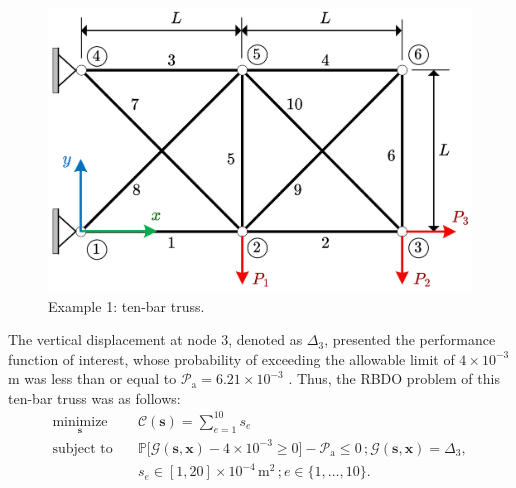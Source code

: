 \documentclass[preprint,3p]{elsarticle}
\begin{document}
\begin{linenumbers}
\begin{figure}[ht]
    \begin{center}
        \includegraphics[scale=0.6]{Fig5.jpg}
    \end{center}
    \caption{Example 1: ten-bar truss.}
    \label{FIG:5}
\end{figure}

The vertical displacement at node 3, denoted as $\Delta_3$,
presented the performance function of interest, whose probability
of exceeding the allowable limit of $4\times10^{-3}$ m was less
than or equal to $\mathcal{P}_\text{a} = 6.21\times10^{-3}$
\cite{Zhao2013}. Thus, the RBDO problem of this ten-bar truss was as follows:
\begin{equation}
    \begin{aligned}
        \underset{\textbf{s}}{\text{minimize}} \quad & \mathcal{C}(\textbf{s}) = \displaystyle\sum_{e=1}^{10} s_e\\
        \text{subject to} \quad &
        \mathbb{P}\bigl[\mathcal{G}(\textbf{s},\textbf{x})-4\times10^{-3} \geq 0 \bigr]-\mathcal{P}_{\text{a}} \leq 0 \,; \mathcal{G}(\textbf{s},\textbf{x}) = \Delta_3,\\
        &s_e \in [1,20]\times10^{-4}\,\text{m}^2\,; e \in \{1,\dots,10\}.
    \end{aligned}
    \label{EQ:26}
\end{equation}


\end{linenumbers}
\end{document}
